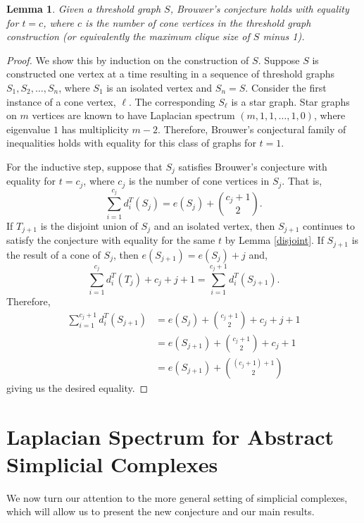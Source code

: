 \documentclass[11pt]{article}
\newtheorem{lm}{Lemma}
\begin{document}
\begin{lm}
Given a threshold graph $S$, Brouwer's conjecture holds with equality for $t = c$, where $c$ is the number of cone vertices in the threshold graph construction (or equivalently the maximum clique size of $S$ minus 1).
\end{lm}

\begin{proof}
We show this by induction on the construction of $S$. Suppose $S$ is constructed one vertex at a time resulting in a sequence of threshold graphs $S_1, S_2, \ldots, S_n$, where $S_1$ is an isolated vertex and $S_n = S$. Consider the first instance of a cone vertex, $\ell$. The corresponding $S_\ell$ is a star graph. Star graphs on $m$ vertices are known to have Laplacian spectrum $\left(m, 1, 1, \ldots, 1,0\right)$, where eigenvalue $1$ has multiplicity $m-2$. Therefore, Brouwer's conjectural family of inequalities holds with equality for this class of graphs for $t = 1$.

For the inductive step, suppose that $S_j$ satisfies Brouwer's conjecture with equality for $t = c_j$, where $c_j$ is the number of cone vertices in $S_j$. That is,
\[ \sum^{c_j}_{i=1} d_i^T (S_j)= e (S_j) + \binom{c_j+1}{2}.\]
If $T_{j+1}$ is the disjoint union of $S_j$ and an isolated vertex, then $S_{j+1}$ continues to satisfy the conjecture with equality for the same $t$ by Lemma \ref{disjoint}. If $S_{j+1}$ is the result of a cone of $S_j$, then $e(S_{j+1}) = e(S_j) + j$ and,
$$\sum^{c_j}_{i=1} d_i^T(T_j) + c_j + j + 1 = \sum^{c_j+1}_{i=1} d_i^T (S_{j+1}).$$
Therefore,
\begin{align*}
\sum^{c_j+1}_{i=1} d_i^T (S_{j+1})& = e(S_j) + \binom{c_j+1}{2} + c_j + j + 1\\
& = e(S_{j+1}) + \binom{c_j+1}{2} + c_j + 1\\
& = e(S_{j+1}) + \binom{(c_j+1) + 1}{2}
\end{align*}
giving us the desired equality.
\end{proof}




\section{Laplacian Spectrum for Abstract Simplicial Complexes}\label{sec:simpcomp}

We now turn our attention to the more general setting of simplicial complexes, which will allow us to present the new conjecture and our main results.
\end{document}
